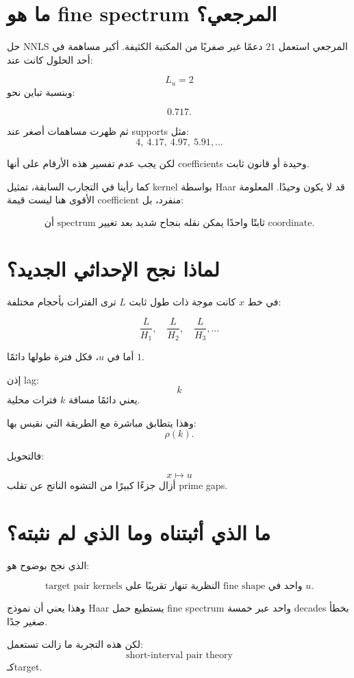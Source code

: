 \documentclass[12pt]{article}
\begin{document}
\section{ما هو fine spectrum المرجعي؟}

حل NNLS المرجعي استعمل \(21\) دعمًا غير صفريًا من المكتبة الكثيفة.
أكبر مساهمة في أحد الحلول كانت عند:

\[
L_u=2
\]
وبنسبة تباين نحو:

\[
0.717.
\]

ثم ظهرت مساهمات أصغر عند supports مثل:
\[
4,\ 4.17,\ 4.97,\ 5.91,\ldots
\]

لكن يجب عدم تفسير هذه الأرقام على أنها coefficients وحيدة أو قانون ثابت.

كما رأينا في التجارب السابقة، تمثيل kernel بواسطة Haar قد لا يكون وحيدًا.
المعلومة الأقوى هنا ليست قيمة coefficient منفرد، بل:

\[
\boxed{
\text{أن spectrum ثابتًا واحدًا يمكن نقله بنجاح شديد بعد تغيير coordinate.}
}
\]

\section{لماذا نجح الإحداثي الجديد؟}

في خط \(x\) كانت موجة ذات طول ثابت \(L\) ترى الفترات بأحجام مختلفة:

\[
\frac{L}{H_1},
\quad
\frac{L}{H_2},
\quad
\frac{L}{H_3},
\ldots
\]

أما في \(u\)، فكل فترة طولها دائمًا \(1\).

إذن lag:
\[
k
\]
يعني دائمًا مسافة \(k\) فترات محلية.

وهذا يتطابق مباشرة مع الطريقة التي نقيس بها:
\[
\rho(k).
\]

فالتحويل:

\[
x\longmapsto u
\]
أزال جزءًا كبيرًا من التشوه الناتج عن تقلب prime gaps.

\section{ما الذي أثبتناه وما الذي لم نثبته؟}

الذي نجح بوضوح هو:

\[
\boxed{
\text{target pair kernels النظرية تنهار تقريبًا على fine shape واحد في }u.
}
\]

وهذا يعني أن نموذج Haar يستطيع حمل fine spectrum واحد عبر خمسة decades
بخطأ صغير جدًا.

لكن هذه التجربة ما زالت تستعمل:
\[
\text{short-interval pair theory}
\]
كـtarget.
\end{document}
